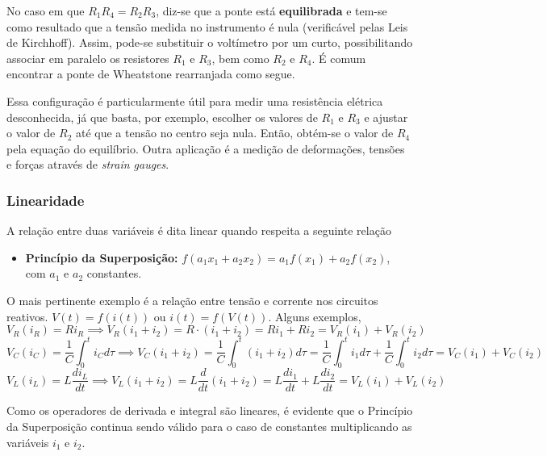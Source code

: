 \documentclass{article}
\numberwithin{equation}{section}
\begin{document}
\noindent No caso em que $R_1R_4=R_2R_3$, diz-se que a ponte está \textbf{equilibrada} e tem-se como resultado que a tensão medida no instrumento é nula (verificável pelas Leis de Kirchhoff). Assim, pode-se substituir o voltímetro por um curto, possibilitando associar em paralelo os resistores $R_1$ e $R_3$, bem como $R_2$ e $R_4$. É comum encontrar a ponte de Wheatstone rearranjada como segue.

\begin{center}
\end{center}

Essa configuração é particularmente útil para medir uma resistência elétrica desconhecida, já que basta, por exemplo, escolher os valores de $R_1$ e $R_3$ e ajustar o valor de $R_2$ até que a tensão no centro seja nula. Então, obtém-se o valor de $R_4$ pela equação do equilíbrio. Outra aplicação é a medição de deformações, tensões e forças através de \textit{strain gauges}.

\subsubsection{Linearidade}
A relação entre duas variáveis é dita linear quando respeita a seguinte relação
\begin{itemize}
    \item \textbf{Princípio da Superposição:} $f(a_1 x_{1}+a_2 x_{2})= a_1f(x_{1})+a_2f(x_{2})$, com $a_1$ e $a_2$ constantes.
\end{itemize}
O mais pertinente exemplo é a relação entre tensão e corrente nos circuitos reativos. $V(t)=f(i(t))$ ou $i(t)=f(V(t))$. Alguns exemplos,
    $$V_R(i_R)=Ri_R \implies V_R(i_1+i_2) = R\cdot(i_1+i_2) = Ri_1+Ri_2 = V_R(i_1) + V_R(i_2)$$
    $$V_C(i_C)=\frac{1}{C}\int_0^ti_Cd\tau \implies V_C(i_1+i_2)=\frac{1}{C}\int_0^t(i_1+i_2)d\tau=\frac{1}{C}\int_0^ti_1d\tau+\frac{1}{C}\int_0^ti_2d\tau=V_C(i_1)+V_C(i_2)$$
    $$V_L(i_L)=L\frac{di_L}{dt} \implies V_L(i_1+i_2)=L\frac{d}{dt}(i_1+i_2)=L\frac{di_1}{dt}+L\frac{di_2}{dt}=V_L(i_1)+V_L(i_2)$$

\noindent Como os operadores de derivada e integral são lineares, é evidente que o Princípio da Superposição continua sendo válido para o caso de constantes multiplicando as variáveis $i_1$ e $i_2$.
\end{document}
